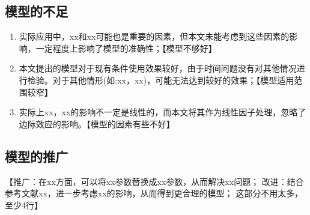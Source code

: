 \subsection{模型的不足}
\begin{enumerate}
\item 实际应用中，xx和xx可能也是重要的因素，但本文未能考虑到这些因素的影响，一定程度上影响了模型的准确性；【模型不够好】
\item 本文提出的模型对于现有条件使用效果较好，由于时间问题没有对其他情况进行检验。对于其他情形(如:xx，xx)，可能无法达到较好的效果；【模型适用范围较窄】
\item 实际上xx，xx的影响不一定是线性的，而本文将其作为线性因子处理，忽略了边际效应的影响。【模型的因素有些不好】
\end{enumerate}
\subsection{模型的推广}
【推广：在xx方面，可以将xx参数替换成xx参数，从而解决xx问题；
改进：结合参考文献xx，进一步考虑xx的影响，从而得到更合理的模型；
这部分不用太多，至少4行】
